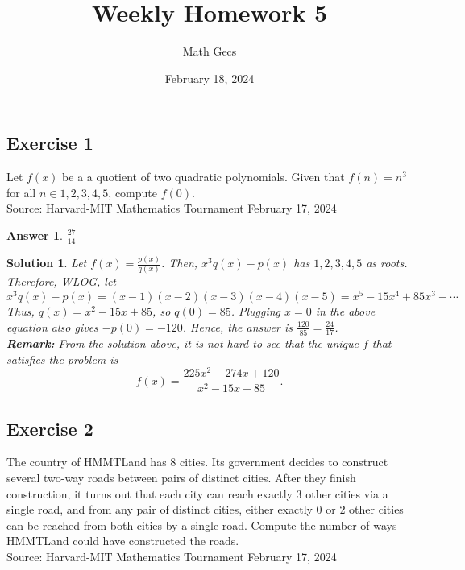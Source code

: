 \documentclass[12pt]{article}
\title{Weekly Homework 5}
\author{Math Gecs}
\date{February 18, 2024}
\newtheorem*{answer*}{Answer}
\newtheorem*{solution*}{Solution}
\begin{document}
\maketitle

\subsection*{Exercise 1}
Let $f(x)$ be a a quotient of two quadratic polynomials. Given that $f(n)=n^3$ for all $n \in {1,2,3,4,5}$, compute $f(0)$.
\\

Source: Harvard-MIT Mathematics Tournament February 17, 2024\\

\begin{answer*}
    $\boxed{\frac{27}{14}}$
\end{answer*}

\begin{solution*}
Let $f(x) = \frac{p(x)}{q(x)}$. Then, $x^3 q(x) - p(x)$ has $1, 2, 3, 4, 5$ as roots. Therefore, WLOG, let
\[
x^3 q(x) - p(x) = (x-1)(x-2)(x-3)(x-4)(x-5) = x^5 - 15x^4 + 85x^3 - \cdots
\]
Thus, $q(x) = x^2 - 15x + 85$, so $q(0) = 85$. Plugging $x = 0$ in the above equation also gives $-p(0) = -120$. Hence, the answer is $\frac{120}{85} = \frac{24}{17}$. \\

\textbf{Remark:} From the solution above, it is not hard to see that the unique $f$ that satisfies the problem is
\[
f(x) = \frac{225x^2 - 274x + 120}{x^2 - 15x + 85}.
\]
\end{solution*}

\vspace{2in}






\subsection*{Exercise 2}
The country of HMMTLand has 8 cities. Its government decides to construct several two-way roads
between pairs of distinct cities. After they finish construction, it turns out that each city can reach
exactly 3 other cities via a single road, and from any pair of distinct cities, either exactly 0 or 2 other
cities can be reached from both cities by a single road. Compute the number of ways HMMTLand
could have constructed the roads.\\

Source: Harvard-MIT Mathematics Tournament February 17, 2024\\
\end{document}
